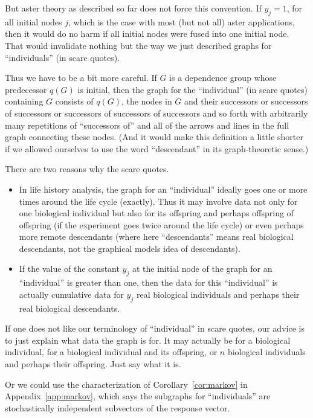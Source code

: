 But aster theory as described so far does not force this convention.
If $y_j = 1$, for all initial nodes $j$, which is the case with most
(but not all) aster applications, then it would do no harm if all initial
nodes were fused into one initial node.  That would invalidate nothing but
the way we just described graphs for ``individuals'' (in scare quotes).

Thus we have to be a bit more careful.  If $G$ is a dependence group whose
predecessor $q(G)$ is initial, then the graph for the ``individual''
(in scare quotes) containing $G$ consists of $q(G)$, the nodes in $G$
and their successors or successors of successors or successors of successors
of successors and so forth with arbitrarily many repetitions
of ``successors of'' and all of the arrows and lines in the full graph
connecting these nodes.
(And it would make this definition a little shorter
if we allowed ourselves to use the word ``descendant'' in its graph-theoretic
sense.)

There are two reasons why the scare quotes.
\begin{itemize}
\item In life history
analysis, the graph for an ``individual'' ideally goes one or more times
around the life cycle (exactly).  Thus it may involve data not only for
one biological individual but also for its offspring and perhaps offspring
of offspring (if the experiment goes twice around the life cycle) or even
perhaps more remote descendants (where here ``descendants'' means real
biological descendants, not the graphical models idea of descendants).
\item If the value of the constant $y_j$ at the initial node of the
graph for an ``individual'' is greater than one, then the data for this
``individual'' is actually cumulative data for $y_j$ real biological
individuals and perhaps their real biological descendants.
\end{itemize}


If one does not like our terminology of ``individual'' in scare quotes,
our advice is to just explain what data the graph is for.  It may actually
be for a biological individual, for a biological individual
and its offspring, or $n$ biological individuals and perhaps their offspring.
Just say what it is.

Or we could use the characterization of Corollary~\ref{cor:markov} in
Appendix~\ref{app:markov}, which says the subgraphs for ``individuals''
are stochastically independent subvectors of the response vector.

